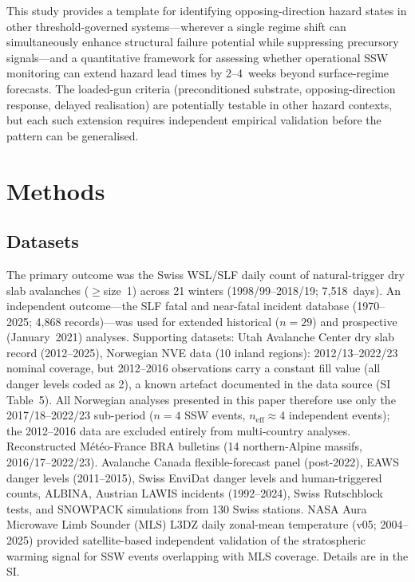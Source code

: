\documentclass[11pt,letterpaper]{article}
\begin{document}
This study provides a template for identifying opposing-direction hazard states in other threshold-governed systems---wherever a single regime shift can simultaneously enhance structural failure potential while suppressing precursory signals---and a quantitative framework for assessing whether operational SSW monitoring can extend hazard lead times by 2--4~weeks beyond surface-regime forecasts. The loaded-gun criteria (preconditioned substrate, opposing-direction response, delayed realisation) are potentially testable in other hazard contexts, but each such extension requires independent empirical validation before the pattern can be generalised.

\section*{Methods}

\subsection*{Datasets}

The primary outcome was the Swiss WSL/SLF daily count of natural-trigger dry slab avalanches ($\geq$size~1) across 21 winters (1998/99--2018/19; 7,518~days). An independent outcome---the SLF fatal and near-fatal incident database (1970--2025; 4,868 records)---was used for extended historical ($n = 29$) and prospective (January~2021) analyses. Supporting datasets: Utah Avalanche Center dry slab record (2012--2025), Norwegian NVE data (10 inland regions): 2012/13--2022/23 nominal coverage, but 2012--2016 observations carry a constant fill value (all danger levels coded as 2), a known artefact documented in the data source (SI Table~5). All Norwegian analyses presented in this paper therefore use only the 2017/18--2022/23 sub-period ($n = 4$ SSW events, $n_{\mathrm{eff}} \approx 4$ independent events); the 2012--2016 data are excluded entirely from multi-country analyses. Reconstructed M\'et\'eo-France BRA bulletins (14 northern-Alpine massifs, 2016/17--2022/23). Avalanche Canada flexible-forecast panel (post-2022), EAWS danger levels (2011--2015), Swiss EnviDat danger levels and human-triggered counts, ALBINA, Austrian LAWIS incidents (1992--2024), Swiss Rutschblock tests, and SNOWPACK simulations from 130 Swiss stations. NASA Aura Microwave Limb Sounder (MLS) L3DZ daily zonal-mean temperature (v05; 2004--2025) provided satellite-based independent validation of the stratospheric warming signal for SSW events overlapping with MLS coverage. Details are in the SI.
\end{document}
